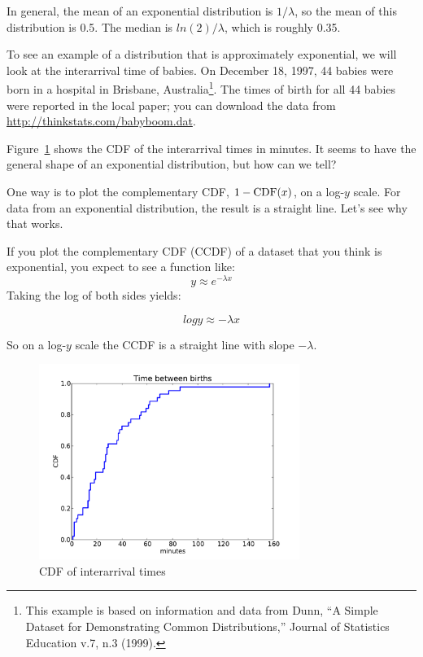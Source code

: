 \documentclass[12pt]{book}
\begin{document}
In general, the mean of an exponential distribution is $1/
\lambda$, so the mean of this distribution is 0.5.  The median is
$ln(2)/\lambda$, which is roughly 0.35.  
  

To see an example of a distribution that is approximately exponential,
we will look at the interarrival time of babies.
On December 18, 1997, 44 babies were born in a hospital in Brisbane,
Australia\footnote{This example is based on information and data from
  Dunn, ``A Simple Dataset for Demonstrating Common Distributions,''
  Journal of Statistics Education v.7, n.3 (1999).}.  The times of
birth for all 44 babies were reported in the local paper; you can
download the data from \url{http://thinkstats.com/babyboom.dat}.

Figure~\ref{interarrival_cdf} shows the CDF of the interarrival times
in minutes.  It seems to have the general shape of an exponential
distribution, but how can we tell?

One way is to plot the complementary CDF, $1-\mathrm{CDF}(x)$, on a
log-$y$ scale.  For data from an exponential distribution, the result
is a straight line.  Let's see why that works.

If you plot the complementary CDF (CCDF) of a dataset that you think is
exponential, you expect to see a function like:
%
\[ y \approx e^{-\lambda x} \]
%
Taking the log of both sides yields:

\[ log y \approx -\lambda x \]

So on a log-$y$ scale the CCDF is a straight line
with slope $-\lambda$.

\begin{figure}
\centerline{\includegraphics[height=2.5in]{figs/interarrivals.pdf}}
\caption{CDF of interarrival times}
\label{interarrival_cdf}
\end{figure}
\end{document}

